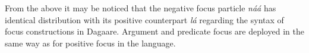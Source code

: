 From the above it may be noticed that the negative focus particle \textit{náá}
has identical distribution with its positive counterpart \textit{lá} regarding the syntax of focus
constructions in Dagaare. Argument and predicate focus are deployed in the same way as for
positive focus in the language.



\sloppy

\printbibliography[title={References}]
